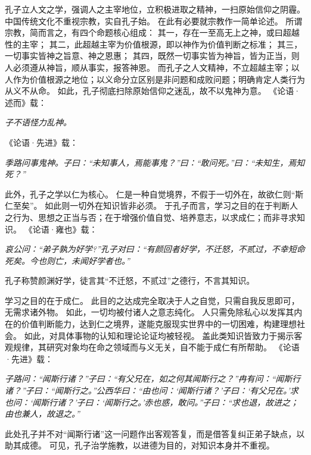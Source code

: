 \documentclass[11pt]{article}
\begin{document}
\par

孔子立人文之学，强调人之主宰地位，立积极进取之精神，一扫原始信仰之阴霾。
中国传统文化不重视宗教，实自孔子始。
在此有必要就宗教作一简单论述。
所谓宗教，简而言之，有四个命题核心组成：
其一，存在一至高无上之神，或曰超越性的主宰；
其二，此超越主宰为价值根源，即以神作为价值判断之标准；
其三，一切事实皆神之旨意、神之恩惠；
其四，既然一切事实皆为神旨，皆为正当，则人必须遵从神旨，顺从事实，报答神恩。
而孔子之人文精神，不立超越主宰；以人作为价值根源之地位；以义命分立区别是非问题和成败问题；明确肯定人类行为从义不从命。
如此，孔子彻底扫除原始信仰之迷乱，故不以鬼神为意。
《论语·述而》载：

\textit{子不语怪力乱神。}

《论语·先进》载：

\textit{季路问事鬼神。子曰：“未知事人，焉能事鬼？”曰：“敢问死。”曰：“未知生，焉知死？”}

\par

此外，孔子之学以仁为核心。
仁是一种自觉境界，不假于一切外在，故欲仁则“斯仁至矣”。
如此则一切外在知识皆非必须。
于孔子而言，学习之目的在于判断人之行为、思想之正当与否；在于增强价值自觉、培养意志，以求成仁；而非寻求知识。
《论语·雍也》载：

\textit{哀公问：“弟子孰为好学?”孔子对曰：“有颜回者好学，不迁怒，不贰过，不幸短命死矣。今也则亡，未闻好学者也。”}

孔子称赞颜渊好学，徒言其“不迁怒，不贰过”之德行，不言其知识。

\par

学习之目的在于成仁。
此目的之达成完全取决于人之自觉，只需自我反思即可，无需求诸外物。
如此，一切均被付诸人之意志纯化。
人只需免除私心以发挥其内在的价值判断能力，达到仁之境界，遂能克服现实世界中的一切困难，构建理想社会。
如此，对具体事物的认知和理论论证均被轻视。
盖此类知识皆致力于揭示客观规律，其研究对象均在命之领域而与义无关，自不能于成仁有所帮助。
《论语·先进》载：

\textit{子路问：“闻斯行诸？”子曰：“有父兄在，如之何其闻斯行之？”冉有问：“闻斯行诸？”子曰：“闻斯行之。”公西华曰：“由也问：‘闻斯行诸？’子曰：‘有父兄在。’求也问：‘闻斯行诸？’子曰：‘闻斯行之。’赤也惑，敢问。”子曰：“求也退，故进之；由也兼人，故退之。”}

此处孔子并不对“闻斯行诸”这一问题作出客观答复，而是借答复纠正弟子缺点，以助其成德。
可见，孔子治学施教，以进德为目的，对知识本身并不重视。

\par
\end{document}
